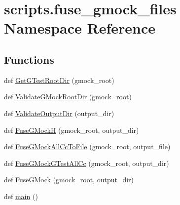 \hypertarget{namespacescripts_1_1fuse__gmock__files}{}\section{scripts.\+fuse\+\_\+gmock\+\_\+files Namespace Reference}
\label{namespacescripts_1_1fuse__gmock__files}
\subsection*{Functions}
\begin{DoxyCompactItemize}
\item 
def \mbox{\hyperlink{namespacescripts_1_1fuse__gmock__files_aaec9da71b23f7103fdd3d03379ed9ab5}{Get\+G\+Test\+Root\+Dir}} (gmock\+\_\+root)
\item 
def \mbox{\hyperlink{namespacescripts_1_1fuse__gmock__files_aa99dcc999c211d9c7384a5f599839519}{Validate\+G\+Mock\+Root\+Dir}} (gmock\+\_\+root)
\item 
def \mbox{\hyperlink{namespacescripts_1_1fuse__gmock__files_a8a8a8aee48bb6d3758d0f9f04210d1f8}{Validate\+Output\+Dir}} (output\+\_\+dir)
\item 
def \mbox{\hyperlink{namespacescripts_1_1fuse__gmock__files_adf0e7c53849e827c73b1d594fcbcd2b4}{Fuse\+G\+MockH}} (gmock\+\_\+root, output\+\_\+dir)
\item 
def \mbox{\hyperlink{namespacescripts_1_1fuse__gmock__files_aa4ad92785274676c45dc98f2357c8d44}{Fuse\+G\+Mock\+All\+Cc\+To\+File}} (gmock\+\_\+root, output\+\_\+file)
\item 
def \mbox{\hyperlink{namespacescripts_1_1fuse__gmock__files_a68cbef9add80c9b8bafe11968456167e}{Fuse\+G\+Mock\+G\+Test\+All\+Cc}} (gmock\+\_\+root, output\+\_\+dir)
\item 
def \mbox{\hyperlink{namespacescripts_1_1fuse__gmock__files_aa846dc5f0327e526e223109d534d5153}{Fuse\+G\+Mock}} (gmock\+\_\+root, output\+\_\+dir)
\item 
def \mbox{\hyperlink{namespacescripts_1_1fuse__gmock__files_aedb6e9c7e3b6b0e773d6a91ccd460d03}{main}} ()
\end{DoxyCompactItemize}
